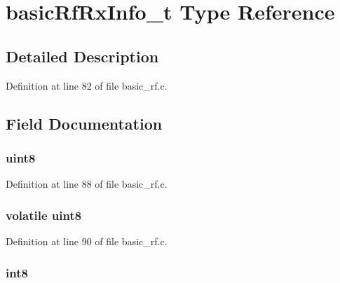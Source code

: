 \hypertarget{typebasic_rf_rx_info__t}{
\section{basicRfRxInfo\_\-t Type Reference}
\label{typebasic_rf_rx_info__t}
}
\par
\par


\subsection{Detailed Description}


Definition at line 82 of file basic\_\-rf.c.



\subsection{Field Documentation}
\hypertarget{typebasic_rf_rx_info__t_ac6a824d3e662c8a11629d5179aacaa02}{
\subsubsection[{ackRequest}]{ {\bfseries uint8 } }}
\label{typebasic_rf_rx_info__t_ac6a824d3e662c8a11629d5179aacaa02}


Definition at line 88 of file basic\_\-rf.c.

\hypertarget{typebasic_rf_rx_info__t_aefd516d27473186a1506a6ce2b59e6c9}{
\subsubsection[{isReady}]{ {\bfseries volatile uint8 } }}
\label{typebasic_rf_rx_info__t_aefd516d27473186a1506a6ce2b59e6c9}


Definition at line 90 of file basic\_\-rf.c.

\hypertarget{typebasic_rf_rx_info__t_abc3373e59c2efb7c3ed00741c911efed}{
\subsubsection[{length}]{ {\bfseries int8 } }}
\label{typebasic_rf_rx_info__t_abc3373e59c2efb7c3ed00741c911efed}


